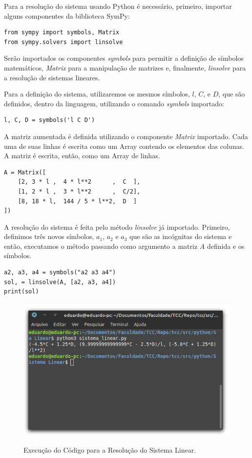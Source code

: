 \documentclass[
	12pt,				%
	openright,			%
    twoside,			%
	a4paper,			%
	english,			%
	french,				%
	spanish,			%
	brazil				%
	]{abntex2}
\numberwithin{lema}{chapter}
\numberwithin{teorema}{chapter}
\numberwithin{definicao}{chapter}
\numberwithin{exemplo}{chapter}
\numberwithin{figure}{chapter}
\begin{document}
\begin{apendicesenv}
{	Para a resolução do sistema usando Python é necessário, primeiro, importar alguns componentes da biblioteca SymPy:
	\begin{lstlisting}[style=Python]
from sympy import symbols, Matrix
from sympy.solvers import linsolve
	\end{lstlisting}
	
	Serão importados os componentes \textit{symbols} para permitir a definição de símbolos matemáticos, \textit{Matrix} para a manipulação de matrizes e, finalmente, \textit{linsolve} para a resolução de sistemas lineares.
	
	Para a definição do sistema, utilizaremos os mesmos símbolos, $l$, $C$, e $D$, que são definidos, dentro da linguagem, utilizando o comando \textit{symbols} importado:
	\begin{lstlisting}[style=Python]
l, C, D = symbols('l C D')
	\end{lstlisting}
	
	A matriz aumentada é definida utilizando o componente \textit{Matrix} importado. Cada uma de suas linhas é escrita como um Array contendo os elementos das colunas. A matriz é escrita, então, como um Array de linhas.
	\begin{lstlisting}[style=Python]
A = Matrix([
    [2, 3 * l ,  4 * l**2      ,  C  ],
    [1, 2 * l ,  3 * l**2      ,  C/2],
    [8, 18 * l,  144 / 5 * l**2,  D  ]
])
	\end{lstlisting}
	
	A resolução do sistema é feita pelo método \textit{linsolve} já importado. Primeiro, definimos três novos símbolos, $a_1$, $a_2$ e $a_3$ que são as incógnitas do sistema e então, executamos o método passando como argumento a matriz $A$ definida e os símbolos.
	\begin{lstlisting}[style=Python]
a2, a3, a4 = symbols("a2 a3 a4")
sol, = linsolve(A, [a2, a3, a4])
print(sol)
	\end{lstlisting}

	\begin{figure}[h]
		\caption{Execução do Código para a Resolução do Sistema Linear.}
		\centering
		\includegraphics[scale=2.5]{../figuras/code/code_solve_sis_linear.png}
		\label{fig:code_solve_sis_linear}
	\end{figure}
	
}
\end{apendicesenv}
\end{document}
